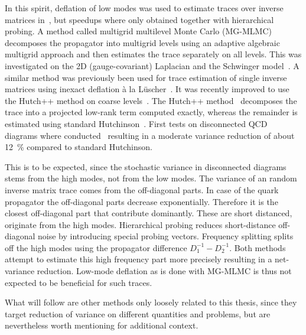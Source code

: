 In this spirit, deflation of low modes was used to estimate traces over inverse matrices in~\cite{Gambhir:2016uwp,Alcalde_2017}, but speedups where only obtained together with hierarchical probing.
A method called multigrid multilevel Monte Carlo (MG-MLMC) decomposes the propagator into multigrid levels using an adaptive algebraic multigrid approach and then estimates the trace separately on all levels.
This was investigated on the 2D (gauge-covariant) Laplacian and the Schwinger model~\cite{doi:10.1137/21M1441894:2022}.
A similar method was previously been used for trace estimation of single inverse matrices using inexact deflation à la Lüscher~\cite{Romero:2019psj}.
It was recently improved to use the Hutch++ method on coarse levels~\cite{Frommer:2022qiy}.
The Hutch++ method~\cite{doi:10.1137/1.9781611976496.16:2021} decomposes the trace into a projected low-rank term computed exactly, whereas the remainder is estimated using standard Hutchinson~\cite{Hutchinson01011990}.
First tests on disconnected QCD diagrams where conducted~\cite{Frommer:2025kfp} resulting in a moderate variance reduction of about \SI{12}{\percent} compared to standard Hutchinson.

This is to be expected, since the stochastic variance in disconnected diagrams stems from the high modes, not from the low modes.
The variance of an random inverse matrix trace comes from the off-diagonal parts.
In case of the quark propagator the off-diagonal parts decrease exponentially.
Therefore it is the closest off-diagonal part that contribute dominantly.
These are short distanced, \ie originate from the high modes.
Hierarchical probing reduces short-distance off-diagonal noise by introducing special probing vectors.
Frequency splitting splits off the high modes using the propagator difference $D_1^{-1} - D_2^{-1}$.
Both methods attempt to estimate this high frequency part more precisely resulting in a net-variance reduction.
Low-mode deflation as is done with MG-MLMC is thus not expected to be beneficial for such traces.

What will follow are other methods only loosely related to this thesis, since they target reduction of variance on different quantities and problems, but are nevertheless worth mentioning for additional context.


